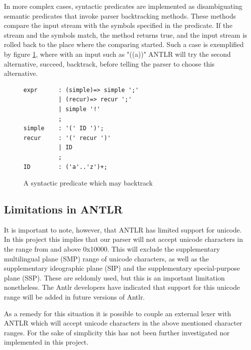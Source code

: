 In more complex cases, syntactic predicates are implemented as disambiguating semantic predicates that invoke parser backtracking methods. These methods compare the input stream with the symbols specified in the predicate. If the stream and the symbols match, the method returns true, and the input stream is rolled back to the place where the comparing started. Such a case is exemplified by figure \ref{code:complexSyntactic}, where with an input such as "((a))" ANTLR will try the second alternative, succeed, backtrack, before telling the parser to choose this alternative.
\begin{figure}[h!]
\begin{verbatim}
expr      : (simple)=> simple ';'
          | (recur)=> recur ';'  
          | simple '!'
          ;
simple    : '(' ID ')';
recur     : '(' recur ')'
          | ID
          ;
ID        : ('a'..'z')+;
\end{verbatim}
\caption{A syntactic predicate which may backtrack}
\label{code:complexSyntactic}
\end{figure}

\subsection{Limitations in ANTLR}
\label{sect:parserconstructanddebug:limitations}
It is important to note, however, that ANTLR has limited support for unicode.
In this project this implies that our parser will not accept unicode characters
in the range from and above 0x10000. This will exclude the supplementary
multilingual plane (SMP) range of unicode characters, as well as the
supplementary ideographic plane (SIP) and the supplementary special-purpose
plane (SSP). These are seldomly used, but this is an important limitation
nonetheless. The Antlr developers have indicated that support for this unicode
range will be added in future versions of Antlr.

As a remedy for this situation it is possible to couple an external lexer with
ANTLR which will accept unicode characters in the above mentioned character
ranges. For the sake of simplicity this has not been further investigated nor
implemented in this project.

